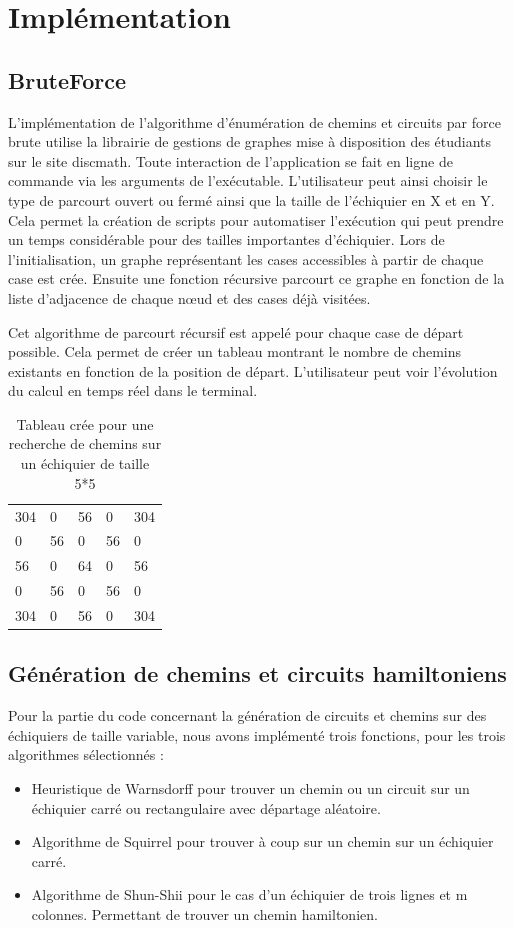 \section{Implémentation}
\subsection{BruteForce}
L'implémentation de l’algorithme d’énumération de chemins et circuits par force brute utilise la librairie de gestions de graphes mise à disposition des étudiants sur le site discmath. Toute interaction de l’application se fait en ligne de commande via les arguments de l’exécutable. L’utilisateur peut ainsi choisir le type de parcourt ouvert ou fermé ainsi que la taille de l’échiquier en X et en Y.  Cela permet la création de scripts pour automatiser l’exécution qui peut prendre un temps considérable pour des tailles importantes d’échiquier.
Lors de l’initialisation, un graphe représentant les cases accessibles à partir de chaque case est crée. Ensuite une fonction récursive parcourt ce graphe en fonction de la liste d’adjacence de chaque nœud et des cases déjà visitées.

Cet algorithme de parcourt récursif est appelé pour chaque case de départ possible. Cela permet de créer un tableau montrant le nombre de chemins existants en fonction de la position de départ. L’utilisateur peut voir l’évolution du calcul en temps réel dans le terminal.
\begin{table}[H]
\centering
\caption{Tableau crée pour une recherche de chemins sur un échiquier de taille 5*5}
\label{my-label}
\begin{tabular}{lllll}
304 & 0  & 56 & 0  & 304 \\
0   & 56 & 0  & 56 & 0   \\
56  & 0  & 64 & 0  & 56  \\
0   & 56 & 0  & 56 & 0   \\
304 & 0  & 56 & 0  & 304
\end{tabular}
\end{table}
\subsection{Génération de chemins et circuits hamiltoniens}
Pour la partie du code concernant la génération de circuits et chemins sur des échiquiers de taille variable, nous avons implémenté trois fonctions, pour les trois algorithmes sélectionnés :
\begin{itemize}
\item Heuristique de Warnsdorff pour trouver un chemin ou un circuit sur un échiquier carré ou rectangulaire avec départage aléatoire.
\item Algorithme de Squirrel pour trouver à coup sur un chemin sur un échiquier carré.
\item Algorithme de Shun-Shii pour le cas d'un échiquier de trois lignes et m colonnes. Permettant de trouver un chemin hamiltonien.
\end{itemize}
